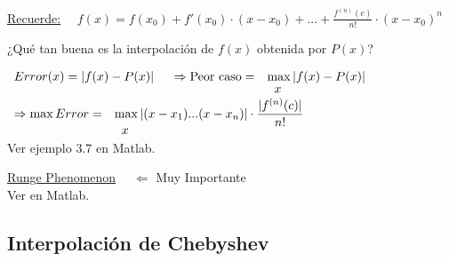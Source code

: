\underline{Recuerde:} \ \ $f(x)=f(x_{0})+f'(x_{0}) \cdot (x-x_{0})+ ... + \frac{f^{(n)}(c)}{n!} \cdot (x-x_{0})^n$ \\[2\baselineskip]

\begin{center}
 ¿Qué tan buena es la interpolación de $f(x)$ obtenida por $P(x)$? 
 \vspace*{1cm}
\end{center}
$
\begin{array}{ll}
Error(x) = |f(x) - P(x)| \ \ \ \ \Rightarrow \text{Peor caso} = & \max |f(x)-P(x)| \\
 \vspace*{-0.5cm} & \\
 &  \hspace{0.2cm} x\\
\end{array}
$
$
\begin{array}{ll}
\Rightarrow \max Error = & \max |(x-x_{1})...(x-x_{n})| \cdot \displaystyle \frac{|f^{(n)}(c)|}{n!}  \\
 \vspace*{-0.5cm} & \\
 &  \hspace{0.2cm} x\\
\end{array}
$\\[3\baselineskip]
Ver ejemplo 3.7 en Matlab. \\
 \begin{center}
  \underline{Runge Phenomenon} \ \ $\Leftarrow$ Muy Importante\\
  Ver en Matlab.
 \end{center}
\newpage

\subsection{Interpolación de Chebyshev} 

